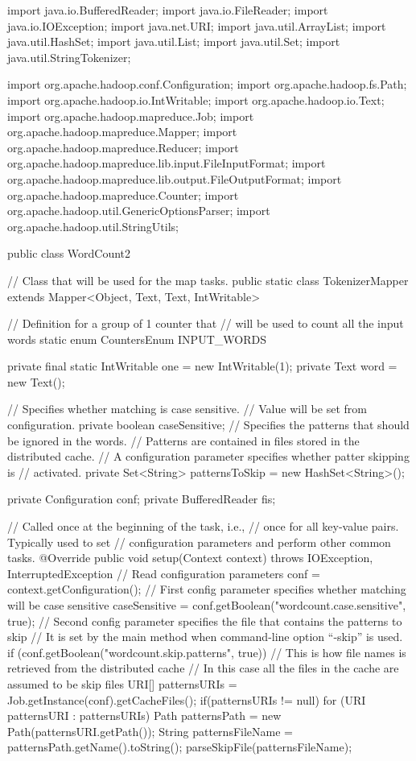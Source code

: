 \documentclass[11pt]{article}
\begin{document}
\begin{java}
import java.io.BufferedReader;
import java.io.FileReader;
import java.io.IOException;
import java.net.URI;
import java.util.ArrayList;
import java.util.HashSet;
import java.util.List;
import java.util.Set;
import java.util.StringTokenizer;

import org.apache.hadoop.conf.Configuration;
import org.apache.hadoop.fs.Path;
import org.apache.hadoop.io.IntWritable;
import org.apache.hadoop.io.Text;
import org.apache.hadoop.mapreduce.Job;
import org.apache.hadoop.mapreduce.Mapper;
import org.apache.hadoop.mapreduce.Reducer;
import org.apache.hadoop.mapreduce.lib.input.FileInputFormat;
import org.apache.hadoop.mapreduce.lib.output.FileOutputFormat;
import org.apache.hadoop.mapreduce.Counter;
import org.apache.hadoop.util.GenericOptionsParser;
import org.apache.hadoop.util.StringUtils;

public class WordCount2 {

  // Class that will be used for the map tasks.
  public static class TokenizerMapper
       extends Mapper<Object, Text, Text, IntWritable>{

    // Definition for a group of 1 counter that
    // will be used to count all the input words
    static enum CountersEnum { INPUT_WORDS }

    private final static IntWritable one = new IntWritable(1);
    private Text word = new Text();

    // Specifies whether matching is case sensitive.
    // Value will be set from configuration.
    private boolean caseSensitive;
    // Specifies the patterns that should be ignored in the words.
    // Patterns are contained in files stored in the distributed cache.
    // A configuration parameter specifies whether patter skipping is
    // activated.
    private Set<String> patternsToSkip = new HashSet<String>();

    private Configuration conf;
    private BufferedReader fis;

    // Called once at the beginning of the task, i.e.,
    // once for all key-value pairs. Typically used to set
    // configuration parameters and perform other common tasks.
    @Override
    public void setup(Context context) throws IOException,
       InterruptedException {
      // Read configuration parameters
      conf = context.getConfiguration();
      // First config parameter specifies whether matching will be case sensitive
      caseSensitive = conf.getBoolean("wordcount.case.sensitive", true);
      // Second config parameter specifies the file that contains the patterns to skip
      // It is set by the main method when command-line option ``-skip'' is used.
      if (conf.getBoolean("wordcount.skip.patterns", true)) {
        // This is how file names is retrieved from the distributed cache
        // In this case all the files in the cache are assumed to be skip files
        URI[] patternsURIs = Job.getInstance(conf).getCacheFiles();
        if(patternsURIs != null)
        for (URI patternsURI : patternsURIs) {
          Path patternsPath = new Path(patternsURI.getPath());
          String patternsFileName = patternsPath.getName().toString();
          parseSkipFile(patternsFileName);
        }
      }
    }

}}
\end{java}
\end{document}
